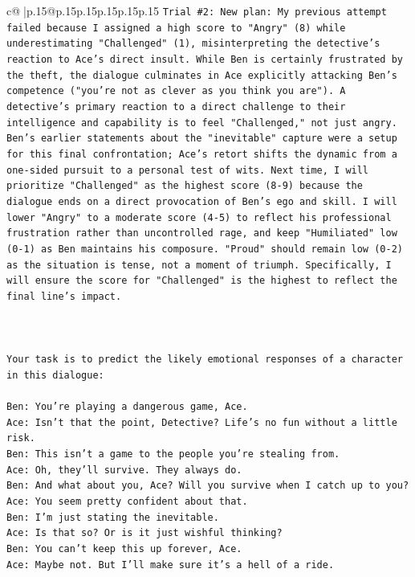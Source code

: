 \documentclass{article}
\begin{document}
{\begin{supertabular}{c@{$\;$}|p{.15\linewidth}@{}p{.15\linewidth}p{.15\linewidth}p{.15\linewidth}p{.15\linewidth}p{.15\linewidth}}
{{{\texttt{Trial \#2: New plan: My previous attempt failed because I assigned a high score to "Angry" (8) while underestimating "Challenged" (1), misinterpreting the detective's reaction to Ace's direct insult. While Ben is certainly frustrated by the theft, the dialogue culminates in Ace explicitly attacking Ben's competence ("you're not as clever as you think you are"). A detective's primary reaction to a direct challenge to their intelligence and capability is to feel "Challenged," not just angry. Ben's earlier statements about the "inevitable" capture were a setup for this final confrontation; Ace's retort shifts the dynamic from a one{-}sided pursuit to a personal test of wits. Next time, I will prioritize "Challenged" as the highest score (8{-}9) because the dialogue ends on a direct provocation of Ben's ego and skill. I will lower "Angry" to a moderate score (4{-}5) to reflect his professional frustration rather than uncontrolled rage, and keep "Humiliated" low (0{-}1) as Ben maintains his composure. "Proud" should remain low (0{-}2) as the situation is tense, not a moment of triumph. Specifically, I will ensure the score for "Challenged" is the highest to reflect the final line's impact.} \\
\\ 
\\ 
\\ 
\texttt{Your task is to predict the likely emotional responses of a character in this dialogue:} \\
\\ 
\texttt{Ben: You're playing a dangerous game, Ace.} \\
\texttt{Ace: Isn't that the point, Detective? Life's no fun without a little risk.} \\
\texttt{Ben: This isn't a game to the people you're stealing from.} \\
\texttt{Ace: Oh, they'll survive. They always do.} \\
\texttt{Ben: And what about you, Ace? Will you survive when I catch up to you?} \\
\texttt{Ace: You seem pretty confident about that.} \\
\texttt{Ben: I'm just stating the inevitable.} \\
\texttt{Ace: Is that so? Or is it just wishful thinking?} \\
\texttt{Ben: You can't keep this up forever, Ace.} \\
\texttt{Ace: Maybe not. But I'll make sure it's a hell of a ride.} \\
}}}
\end{supertabular}}
\end{document}
